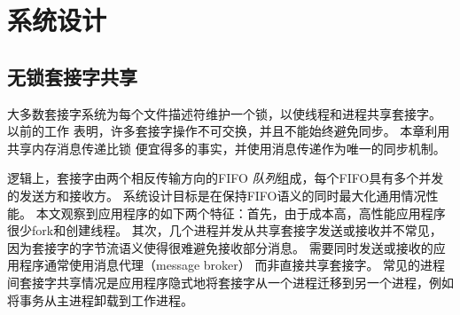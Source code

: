 

\section{系统设计}
\label{socksdirect:sec:design}


\subsection{无锁套接字共享}
\label{socksdirect:subsec:fork}


大多数套接字系统为每个文件描述符维护一个锁，以使线程和进程共享套接字。
以前的工作 \cite {boyd2010analysis,clements2015scalable} 表明，许多套接字操作不可交换，并且不能始终避免同步。
本章利用共享内存消息传递比锁 \cite {roghanchi2017ffwd} 便宜得多的事实，并使用消息传递作为唯一的同步机制。


逻辑上，套接字由两个相反传输方向的FIFO \emph {队列}组成，每个FIFO具有多个并发的发送方和接收方。
系统设计目标是在保持FIFO语义的同时最大化通用情况性能。
本文观察到应用程序的如下两个特征：首先，由于成本高，高性能应用程序很少fork和创建线程。
其次，几个进程并发从共享套接字发送或接收并不常见，因为套接字的字节流语义使得很难避免接收部分消息。
需要同时发送或接收的应用程序通常使用消息代理（message broker） \cite {hintjens2013zeromq,rabbitmq2017rabbitmq,kreps2011kafka} 而非直接共享套接字。
常见的进程间套接字共享情况是应用程序隐式地将套接字从一个进程迁移到另一个进程，例如将事务从主进程卸载到工作进程。






